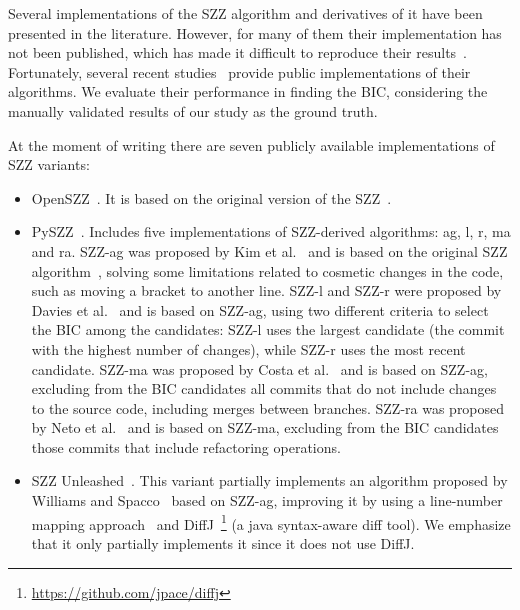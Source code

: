 Several implementations of the SZZ algorithm and derivatives of it have been presented in the literature. However, for many of them their implementation has not been published, which has made it difficult to reproduce their results~\cite{rodriguez2018reproducibility}. 
Fortunately, several recent studies~\cite{borg2019szz,lenarduzzi2020openszz,pokropinski2022szz,rosa2021evaluating} provide public implementations of their algorithms. 
We evaluate their performance in finding the BIC, considering the manually validated results of our study as the ground truth.

At the moment of writing there are seven publicly available implementations of SZZ variants:
\begin{itemize}
    \item OpenSZZ~\cite{lenarduzzi2020openszz}. It is based on the original version of the SZZ~\cite{sliwerski2005changes}.
    \item PySZZ~\cite{rosa2021evaluating}. Includes five implementations of SZZ-derived algorithms: ag, l, r, ma and ra.
    SZZ-ag was proposed by Kim et al.~\cite{kim2006automatic} and is based on the original SZZ algorithm~\cite{sliwerski2005changes}, solving some limitations related to cosmetic changes in the code, such as moving a bracket to another line.
    SZZ-l and SZZ-r were proposed by Davies et al.~\cite{davies2014comparing} and is based on SZZ-ag, using two different criteria to select the BIC among the candidates: SZZ-l uses the largest candidate (the commit with the highest number of changes), while SZZ-r uses the most recent candidate.
    SZZ-ma was proposed by Costa et al.~\cite{da2016framework} and is based on SZZ-ag, excluding from the BIC candidates all commits that do not include changes to the source code, including merges between branches.
    SZZ-ra was proposed by Neto et al.~\cite{neto2018impact} and is based on SZZ-ma, excluding from the BIC candidates those commits that include refactoring operations.
    \item SZZ Unleashed~\cite{borg2019szz}. This variant partially implements an algorithm proposed by Williams and Spacco~\cite{williams2008szz} based on SZZ-ag, improving it by using a line-number mapping approach~\cite{williams2008branching} and DiffJ~\footnote{\url{https://github.com/jpace/diffj}} (a java syntax-aware diff tool). We emphasize that it only partially implements it since it does not use DiffJ.
\end{itemize}


